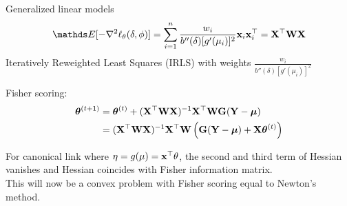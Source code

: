 \documentclass[11pt,compress,t,notes=noshow, xcolor=table]{beamer}
\begin{document}
\begin{vbframe}{Generalized linear models}
$$\E[-\nabla^2 \logl_{\theta}(\delta, \phi)] = \sumin \frac{w_i}{b''(\delta)[g'(\mu_i)]^2}\xv_i\xv_i^\top = \mathbf{X}^\top \mathbf{W} \mathbf{X}$$
\lz
Iteratively Reweighted Least Squares (IRLS) with weights $\frac{w_i}{b''(\delta)[g'(\mu_i)]^2}$\\

\framebreak

Fisher scoring:
\begin{align*}
\bm{\theta}^{(t+1)} &=\bm{\theta}^{(t)} + (\mathbf{X}^\top \mathbf{W} \mathbf{X})^{-1}\mathbf{X}^\top \mathbf{W} \mathbf{G} (\mathbf{Y}-\bm{\mu})\\
& =(\mathbf{X}^\top \mathbf{W} \mathbf{X})^{-1}\mathbf{X}^\top \mathbf{W} \left(\mathbf{G} (\mathbf{Y}-\bm{\mu})+\mathbf{X}\bm{\theta}^{(t)}\right)
\end{align*}

\lz

For canonical link where $\eta = g(\mu) = \mathbf{x}^\top\theta$, the second and third term of Hessian vanishes and Hessian coincides with Fisher information matrix.\\
\lz
This will now be a convex problem with Fisher scoring equal to Newton's method.

\end{vbframe}

\endlecture
\end{document}

